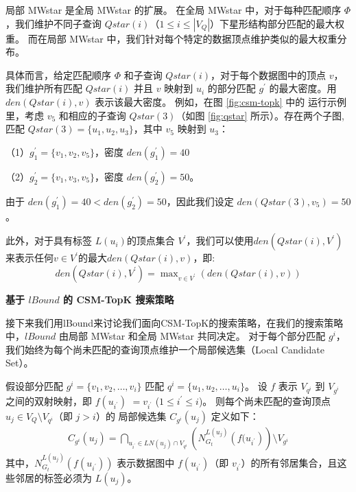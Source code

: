 局部 MWstar 是全局 MWstar 的扩展。
在全局 MWstar 中，对于每种匹配顺序 $\Phi$，我们维护不同子查询 $Qstar(i)$（$1\leq i\leq |V_Q|$）下星形结构部分匹配的最大权重。
而在局部 MWstar 中，我们针对每个特定的数据顶点维护类似的最大权重分布。

具体而言，给定匹配顺序 $\Phi$ 和子查询 $Qstar(i)$，对于每个数据图中的顶点 $v$，我们维护所有匹配 $Qstar(i)$ 并且 $v$ 映射到 $u_i$ 的部分匹配 $g^\prime$ 的最大密度。用 $den(Qstar(i), v)$ 表示该最大密度。
例如，在图 \ref{fig:csm-topk} 中的 运行示例 里，考虑 $v_5$ 和相应的子查询 $Qstar(3)$（如图 \ref{fig:qstar} 所示）。存在两个子图,匹配 $Qstar(3)=\{u_1, u_2, u_3\}$，其中 $v_5$ 映射到 $u_3$：

     （1）$g_1^\prime=\{v_1, v_2, v_5\}$，密度 $den(g_1^\prime) = 40$

     （2）$g_2^\prime=\{v_1, v_3, v_5\}$，密度 $den(g_2^\prime) = 50$。

由于 $den(g_1^\prime)= 40 < den(g_2^\prime)=50$，因此我们设定 $den(Qstar(3), v_5) = 50$。

此外，对于具有标签 $L(u_i)$的顶点集合 $V^\prime$，我们可以使用$den(Qstar(i), V^\prime)$来表示任何$v\in V^\prime$的最大$den(Qstar(i), v)$，即:
\begin{equation}\label{equation:den-qstar-v}
	den(Qstar(i), V^\prime) = \max\nolimits_{v\in V^\prime}\left(den(Qstar(i), v)\right)
\end{equation}


\textbf{基于 $lBound$ 的 CSM-TopK 搜索策略}

接下来我们用lBound来讨论我们面向CSM-TopK的搜索策略，在我们的搜索策略中，$lBound$ 由局部 MWstar 和全局 MWstar 共同决定。
对于每个部分匹配 $g^i$，我们始终为每个尚未匹配的查询顶点维护一个局部候选集（Local Candidate Set）。


\begin{definition} [局部候选集] \label{def:local-candidate-set}
    假设部分匹配 $g^i=\{v_1, v_2, \dots, v_i\}$ 匹配 $q^i=\{u_1, u_2, \dots, u_i\}$。
    设 $f$ 表示  $V_{q^i}$  到 $V_{g^i}$ 之间的双射映射，即 $f(u_{i^\prime})$ $=v_{i^\prime}$ ($1\leq i^\prime\leq i$)。
    则每个尚未匹配的查询顶点 $u_j \in V_Q\setminus V_{q^i}$（即 $j>i$）的 局部候选集 $C_{g^i}(u_j)$ 定义如下：
    \begin{equation} \label{equation:local-candidate-set}
    \begin{multlined}
    C_{g^i}(u_j) = \bigcap\nolimits_{u_{i^\prime}\in LN(u_j)\cap V_{q^i}} \left(N_{G_t}^{L(u_j)}\left(f(u_{i^\prime}\right)\right) \setminus V_{g^i}
    \end{multlined}
    \end{equation}
    其中，$N_{G_t}^{L(u_j)}(f(u_{i^\prime}))$ 表示数据图中 $f(u_{i^\prime})$（即 $v_{i^\prime}$）的所有邻居集合，且这些邻居的标签必须为 $L(u_j)$。
\end{definition}


